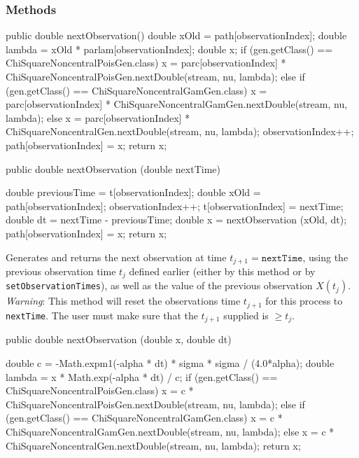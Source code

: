\subsubsection* {Methods}
\begin{code}\begin{hide}

   public double nextObservation() {
      double xOld = path[observationIndex];
      double lambda = xOld * parlam[observationIndex];
      double x;
      if (gen.getClass() == ChiSquareNoncentralPoisGen.class)
         x = parc[observationIndex] *
             ChiSquareNoncentralPoisGen.nextDouble(stream, nu, lambda);
      else if (gen.getClass() == ChiSquareNoncentralGamGen.class)
         x = parc[observationIndex] *
             ChiSquareNoncentralGamGen.nextDouble(stream, nu, lambda);
      else
         x = parc[observationIndex] *
             ChiSquareNoncentralGen.nextDouble(stream, nu, lambda);
      observationIndex++;
      path[observationIndex] = x;
      return x;
   }

\end{hide}
   public double nextObservation (double nextTime) \begin{hide} {
      double previousTime = t[observationIndex];
      double xOld = path[observationIndex];
      observationIndex++;
      t[observationIndex] = nextTime;
      double dt = nextTime - previousTime;
      double x = nextObservation (xOld, dt);
      path[observationIndex] = x;
      return x;
    }\end{hide}
\end{code}
\begin{tabb} Generates and returns the next observation at time $t_{j+1} =
 \texttt{nextTime}$, using the previous observation time $t_{j}$ defined earlier
(either by this method or by \texttt{setObservation\-Times}),
as well as the value of the previous observation $X(t_j)$.
\emph{Warning}: This method will reset the observations time $t_{j+1}$
for this process to \texttt{nextTime}. The user must make sure that
the $t_{j+1}$ supplied is $\geq t_{j}$.
\end{tabb}
\begin{code}

   public double nextObservation (double x, double dt) \begin{hide} {
      double c = -Math.expm1(-alpha * dt) * sigma * sigma / (4.0*alpha);
      double lambda = x * Math.exp(-alpha * dt) / c;
      if (gen.getClass() == ChiSquareNoncentralPoisGen.class)
         x = c * ChiSquareNoncentralPoisGen.nextDouble(stream, nu, lambda);
      else if (gen.getClass() == ChiSquareNoncentralGamGen.class)
         x = c * ChiSquareNoncentralGamGen.nextDouble(stream, nu, lambda);
      else
         x = c * ChiSquareNoncentralGen.nextDouble(stream, nu, lambda);
      return x;
    }\end{hide}
\end{code}
